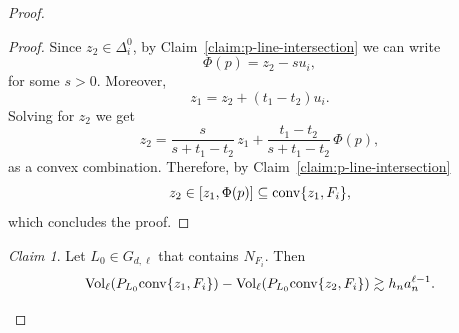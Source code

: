 \documentclass[10pt]{amsart}
\newcommand{\1}{\textbf{1}}
\newcommand{\conv}{{\rm conv}}
\newcommand{\vol}{{\rm Vol}}
\numberwithin{equation}{section} %
\theoremstyle{remark}
\newtheorem{claim}{Claim}
\theoremstyle{definition}
\begin{document}
\begin{proof}
     \begin{proof}
         Since $z_2 \in \Delta_i^0$, by Claim~\ref{claim:p-line-intersection} we can write \[\Phi(p)=z_2-su_i,\] for some $s>0$. Moreover, \[z_1=z_2+(t_1-t_2)u_i.\] Solving for $z_2$ we get \[z_2=\frac{s}{s+t_1-t_2}\,z_1+\frac{t_1-t_2}{s+t_1-t_2}\, \Phi(p),\] as a convex combination. Therefore, by Claim~\ref{claim:p-line-intersection} \[z_2 \in [z_1,\Phi(p)] \subseteq \conv\{z_1,F_i\},\] which concludes the proof.
     \end{proof}

     

     \begin{claim}\label{claim:subspaces-containing-NF}
        Let $L_0 \in G_{d, \ell}$ that contains $N_{F_i}$. Then \[\vol_{\ell}(P_{L_0} \conv\{z_1,F_i\}) - \vol_{\ell}(P_{L_0} \conv\{z_2,F_i\}) \gtrsim h_na_n^{\ell-1}.\]
     \end{claim}


\end{proof}
\end{document}
